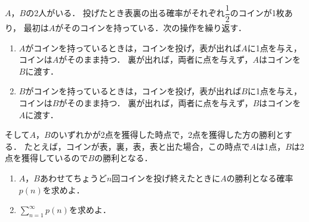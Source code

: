 \documentclass[../../main.tex]{subfiles}
\begin{document}
$A$，$B$の2人がいる．
投げたとき表裏の出る確率がそれぞれ$\displaystyle\dfrac{1}{2}$のコインが1枚あり，
最初は$A$がそのコインを持っている．次の操作を繰り返す．
\begin{enumerate}
  \item $A$がコインを持っているときは，コインを投げ，表が出れば$A$に1点を与え，コインは$A$がそのまま持つ．
    裏が出れば，両者に点を与えず，$A$はコインを$B$に渡す．
  \item $B$がコインを持っているときは，コインを投げ，表が出れば$B$に1点を与え，コインは$B$がそのまま持つ．
    裏が出れば，両者に点を与えず，$B$はコインを$A$に渡す．
\end{enumerate}
そして$A$，$B$のいずれかが2点を獲得した時点で，2点を獲得した方の勝利とする．
たとえば，コインが表，裏，表，表と出た場合，この時点で$A$は1点，$B$は2点を獲得しているので$B$の勝利となる．
\begin{enumerate}
  \item $A$，$B$あわせてちょうど$n$回コインを投げ終えたときに$A$の勝利となる確率$p(n)$を求めよ．
  \item $\displaystyle\sum_{n=1}^\infty p(n)$を求めよ．
\end{enumerate}
\end{document}
